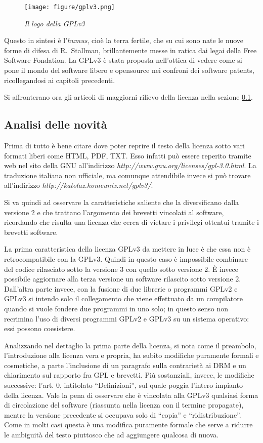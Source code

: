 \begin{figure}[b]
	\begin{center}
		\texttt{[image: figure/gplv3.png]}
	\end{center}
	\caption{\textit{Il logo della GPLv3}}
\end{figure}

Questo in sintesi è l'\textit{humus}, cioè la terra fertile, che su cui sono nate le nuove forme di difesa di R.~Stallman, brillantemente messe in ratica dai legai della Free Software Fondation. La GPLv3 è stata proposta nell'ottica di vedere come si pone il mondo del software libero e opensource nei confroni dei software patents, ricollegandosi ai capitoli precedenti.

Si affronterano ora gli articoli di maggiorni rilievo della licenza nella sezione \ref{sec:analisi-gpl3}.

\subsection{Analisi delle novità} \label{sec:analisi-gpl3}
Prima di tutto è bene citare dove poter reprire il testo della licenza sotto vari formati liberi come HTML, PDF, TXT. Esso infatti può essere reperito tramite web nel sito della GNU all'indirizzo \textit{http://www.gnu.org/licenses/gpl-3.0.html}. La traduzione italiana non ufficiale, ma comunque attendibile invece si può trovare all'indirizzo \textit{http://katolaz.homeunix.net/gplv3/}.

Si va quindi ad osservare la caratteristiche saliente che la diversificano dalla versione 2 e che trattano l'argomento dei brevetti vincolati al software, ricordando che risulta una licenza che cerca di vietare i privilegi ottentui tramite i brevetti software.

La prima caratteristica della licenza GPLv3 da mettere in luce è che essa non è retrocompatibile con la GPLv3. Quindi in questo caso è impossibile combinare del codice rilasciato sotto la versione 3 con quello sotto versione 2. \`E invece possibile aggiornare alla terza versione un software rilascito sotto versione 2. Dall'altra parte invece, con la fusione di due librerie o programmi GPLv2 e GPLv3 si intendo solo il collegamento che viene effettuato da un compilatore quando si vuole fondere due programmi in uno solo; in questo senso non recrimina l'uso di diversi programmi GPLv2 e GPLv3 su un sistema operativo: essi possono coesistere.

Analizzando nel dettaglio la prima parte della licenza, si nota come il preambolo, l’introduzione alla licenza vera e propria, ha subito modifiche puramente formali e cosmetiche, a parte l’inclusione di un paragrafo sulla contrarietà ai DRM e un chiarimento sul rapporto fra GPL e brevetti.
Più sostanziali, invece, le modifiche successive: l'art. 0, intitolato “Definizioni”, sul quale poggia l’intero impianto della licenza. Vale la pena di osservare che è vincolata alla GPLv3 qualsiasi forma di circolazione del software (riassunta nella licenza con il termine propagate), mentre la versione precedente si occupava solo di “copia” e “ridistribuzione”. Come in molti casi questa è una modifica puramente formale che serve a ridurre le ambiguità del testo piuttosco che ad aggiungere qualcosa di nuova.

